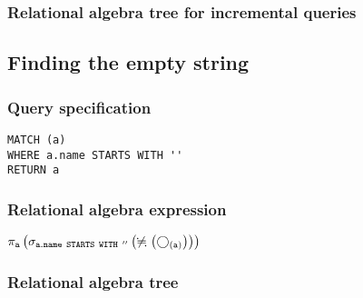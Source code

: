 \subsubsection*{Relational algebra tree for incremental queries}


\subsection{Finding the empty string}

\subsubsection*{Query specification}

\begin{lstlisting}
MATCH (a)
WHERE a.name STARTS WITH ''
RETURN a
\end{lstlisting}

\subsubsection*{Relational algebra expression}

$\projection{\var{a}} \left(\selection{\mathtt{a.name~STARTS~WITH~''}} \left(\alldifferent{} \left(\getvertices{a}{}\right)\right)\right)$

\subsubsection*{Relational algebra tree}


